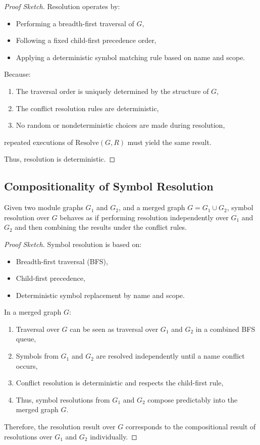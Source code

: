 \documentclass[sigplan,screen]{acmart}
\begin{document}
\begin{proof}[Proof Sketch]
Resolution operates by:
\begin{itemize}
    \item Performing a breadth-first traversal of $G$,
    \item Following a fixed child-first precedence order,
    \item Applying a deterministic symbol matching rule based on name and scope.
\end{itemize}
Because:
\begin{enumerate}
    \item The traversal order is uniquely determined by the structure of $G$,
    \item The conflict resolution rules are deterministic,
    \item No random or nondeterministic choices are made during resolution,
\end{enumerate}
repeated executions of $\text{Resolve}(G, R)$ must yield the same result.

Thus, resolution is deterministic.
\end{proof}    

\subsection{Compositionality of Symbol Resolution}
\label{sec:compositionality}

\begin{theorem}[Compositionality]
Given two module graphs $G_1$ and $G_2$, and a merged graph $G = G_1 \cup G_2$, 
symbol resolution over $G$ behaves as if performing resolution independently 
over $G_1$ and $G_2$ and then combining the results under the conflict rules.
\end{theorem}

\begin{proof}[Proof Sketch]
Symbol resolution is based on:
\begin{itemize}
    \item Breadth-first traversal (BFS),
    \item Child-first precedence,
    \item Deterministic symbol replacement by name and scope.
\end{itemize}

In a merged graph $G$:
\begin{enumerate}
    \item Traversal over $G$ can be seen as traversal over $G_1$ and $G_2$ in a combined BFS queue,
    \item Symbols from $G_1$ and $G_2$ are resolved independently until a name conflict occurs,
    \item Conflict resolution is deterministic and respects the child-first rule,
    \item Thus, symbol resolutions from $G_1$ and $G_2$ compose predictably into the merged graph $G$.
\end{enumerate}

Therefore, the resolution result over $G$ corresponds to the compositional result of resolutions over $G_1$ and $G_2$ individually.
\end{proof}
\end{document}
